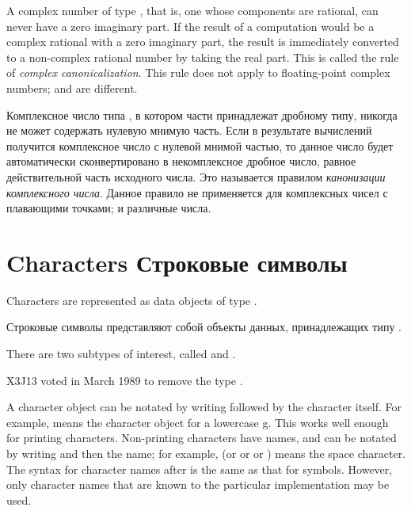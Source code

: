 A complex number of type , that is, one whose
components are rational, can never have a zero imaginary part.
If the result of a computation would be a complex rational
with a zero imaginary part, the result is immediately
converted to a non-complex rational number by taking the
real part.  This is called the rule of \emph{complex canonicalization}.
This rule does not apply to floating-point complex numbers;
 and  are different.

Комплексное число типа , в котором части принадлежат
дробному типу, никогда не может содержать нулевую мнимую часть. Если в
результате вычислений получится комплексное число с нулевой мнимой частью, то
данное число будет автоматически сконвертировано в некомплексное дробное число,
равное действительной часть исходного числа. Это называется правилом {\it
 канонизации комплексного числа}. Данное правило не применяется для комплексных
чисел с плавающими точками;  и  различные числа.

\goodbreak

\section{Characters Строковые символы}

Characters are represented as data objects of type .

Строковые символы представляют собой объекты данных, принадлежащих типу
.
\begin{obsolete}
There are two subtypes of interest,
called  and .
\end{obsolete}
\begin{newer}
X3J13 voted in March 1989  to remove the type .
\end{newer}

A character object can be notated by writing \cd{\#{\Xbackslash}} followed
by the character itself.  For example,  means the character
object for a lowercase g.  This works well enough for printing
characters.  Non-printing characters have names, and can be notated
by writing \cd{\#{\Xbackslash}} and then the name; for example, 
(or  or  or )
means the space character.  The syntax for character names after \cd{\#{\Xbackslash}}
is the same as that for symbols.  However, only character names
that are known to the particular implementation may be used.

